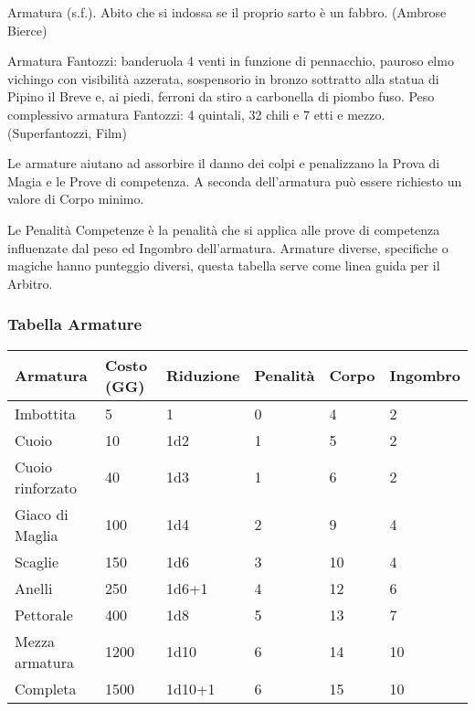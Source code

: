 \documentclass[12pt,a4paper,twoside,openany]{book}
\begin{document}
\label{equipaggiamento---armature-e-scudi}

\begin{changemargin}{0.3cm}{0.3cm}\begin{enfasi}{
Armatura (s.f.). Abito che si indossa se il proprio sarto è un fabbro. (Ambrose Bierce)

\medskip

Armatura Fantozzi: banderuola 4 venti in funzione di pennacchio, pauroso elmo vichingo con visibilità azzerata, sospensorio in bronzo sottratto alla statua di Pipino il Breve e, ai piedi, ferroni da stiro a carbonella di piombo fuso. Peso complessivo armatura Fantozzi: 4 quintali, 32 chili e 7 etti e mezzo. (Superfantozzi, Film)} \end{enfasi}\end{changemargin}\medskip

Le armature aiutano ad assorbire il danno dei colpi e penalizzano la Prova di Magia e le Prove di competenza. A seconda dell'armatura può essere richiesto un valore di Corpo minimo.

Le Penalità Competenze è la penalità che si applica alle prove di competenza influenzate dal peso ed Ingombro dell'armatura. Armature diverse, specifiche o magiche hanno punteggio diversi, questa tabella serve come linea guida per il Arbitro.

\subsubsection{Tabella Armature}

\label{tabella-armature}
\begin{tabular}{llllll}
\textbf{Armatura} & \textbf{Costo (GG)} & \textbf{Riduzione} & \textbf{Penalità} & \textbf{Corpo} &\textbf{Ingombro}\\
\toprule		%
Imbottita  		& 5		& 1		& 0	 & 4  &	2\\
Cuoio 			& 10	& 1d2 	& 1	 & 5  &	2\\
Cuoio rinforzato& 40	& 1d3 	& 1  & 6  & 2\\
Giaco di Maglia & 100 	& 1d4 	& 2  & 9  & 4\\
Scaglie			& 150 	& 1d6 	& 3  & 10 & 4\\
Anelli 			& 250  	& 1d6+1 & 4  & 12 & 6\\
Pettorale  		& 400  	& 1d8 	& 5  & 13 & 7\\
Mezza armatura  & 1200 	& 1d10 	& 6  & 14 & 10\\
Completa		& 1500 	& 1d10+1& 6  & 15 & 10\\
\end{tabular}
\end{document}
